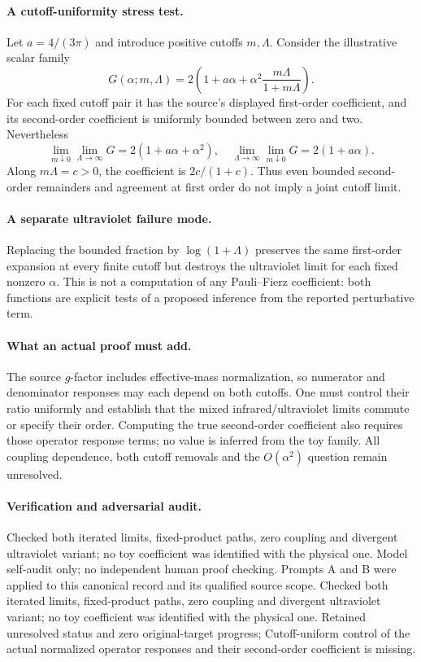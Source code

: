 \documentclass[11pt]{article}
\begin{document}
\paragraph{A cutoff-uniformity stress test.} Let $a=4/(3\pi)$ and introduce positive cutoffs $m,\Lambda$. Consider the illustrative scalar family
\[
 G(\alpha;m,\Lambda)=2\left(1+a\alpha+\alpha^2\frac{m\Lambda}{1+m\Lambda}\right).
\]
For each fixed cutoff pair it has the source's displayed first-order coefficient, and its second-order coefficient is uniformly bounded between zero and two. Nevertheless
\[
 \lim_{m\downarrow0}\lim_{\Lambda\to\infty}G=2(1+a\alpha+\alpha^2),\quad
 \lim_{\Lambda\to\infty}\lim_{m\downarrow0}G=2(1+a\alpha).
\]
Along $m\Lambda=c>0$, the coefficient is $2c/(1+c)$. Thus even bounded second-order remainders and agreement at first order do not imply a joint cutoff limit.

\paragraph{A separate ultraviolet failure mode.} Replacing the bounded fraction by $\log(1+\Lambda)$ preserves the same first-order expansion at every finite cutoff but destroys the ultraviolet limit for each fixed nonzero $\alpha$. This is not a computation of any Pauli--Fierz coefficient: both functions are explicit tests of a proposed inference from the reported perturbative term.

\paragraph{What an actual proof must add.} The source $g$-factor includes effective-mass normalization, so numerator and denominator responses may each depend on both cutoffs. One must control their ratio uniformly and establish that the mixed infrared/ultraviolet limits commute or specify their order. Computing the true second-order coefficient also requires those operator response terms; no value is inferred from the toy family. All coupling dependence, both cutoff removals and the $O(\alpha^2)$ question remain unresolved.

\paragraph{Verification and adversarial audit.}
Checked both iterated limits, fixed-product paths, zero coupling and divergent ultraviolet variant; no toy coefficient was identified with the physical one. Model self-audit only; no independent human proof checking. Prompts A and B were applied to this canonical record and its qualified source scope. Checked both iterated limits, fixed-product paths, zero coupling and divergent ultraviolet variant; no toy coefficient was identified with the physical one. Retained unresolved status and zero original-target progress; Cutoff-uniform control of the actual normalized operator responses and their second-order coefficient is missing.
\end{document}
